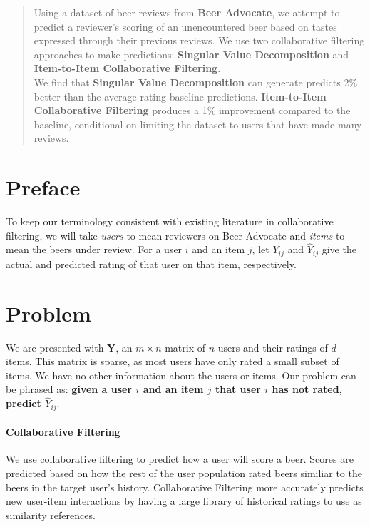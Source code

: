 \documentclass[12pt]{article}
\begin{document}
\maketitle
\begin{abstract}
Using a dataset of beer reviews from \textbf{Beer Advocate}, we attempt to predict a reviewer's scoring of an unencountered beer based on tastes expressed through their previous reviews. We use two collaborative filtering approaches to make predictions: \textbf{Singular Value Decomposition} and \textbf{Item-to-Item Collaborative Filtering}. \\

We find that \textbf{Singular Value Decomposition} can generate predicts 2\% better than the average rating baseline predictions. \textbf{Item-to-Item Collaborative Filtering} produces a 1\% improvement compared to the baseline, conditional on limiting the dataset to users that have made many reviews. \\
\end{abstract}



\section{Preface}
To keep our terminology consistent with existing literature in collaborative filtering, we will take \textit{users} to mean reviewers on Beer Advocate and \textit{items} to mean the beers under review. For a user $i$ and an item $j$, let $Y_{ij}$ and $\hat Y_{ij}$ give the actual and predicted rating of that user on that item, respectively.

\section{Problem}
We are presented with $\mathbf{Y}$, an $m \times n$ matrix of $n$ users and their ratings of $d$ items. This matrix is sparse, as most users have only rated a small subset of items. We have no other information about the users or items. Our problem can be phrased as: \textbf{given a user $i$ and an item $j$ that user $i$ has not rated, predict $\hat Y_{ij}$}.

\paragraph{Collaborative Filtering} We use collaborative filtering to predict how a user will score a beer.  Scores are predicted based on how the rest of the user population rated beers similiar to the beers in the target user's history. Collaborative Filtering more accurately predicts new user-item interactions by having a large library of historical ratings to use as similarity references.
\end{document}
